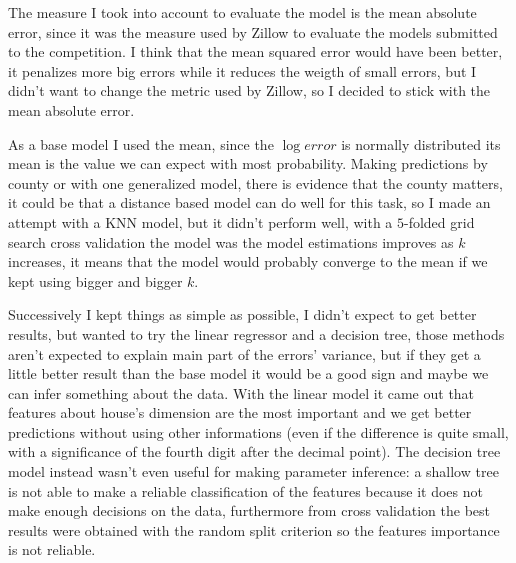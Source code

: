 The measure I took into account to evaluate the model is the mean absolute error, since it was the measure used by Zillow to evaluate the models submitted to the competition. I think that the mean squared error would have been better, it penalizes more big errors while it reduces the weigth of small errors, but I didn't want to change the metric used by Zillow, so I decided to stick with the mean absolute error.


As a base model I used the mean, since the $\log error$ is normally distributed its mean is the value we can expect with most probability. Making predictions by county or with one generalized model, there is evidence that the county matters, it could be that a distance based model can do well for this task, so I made an attempt with a KNN model, but it didn't perform well, with a $5$-folded grid search cross validation the model was the model estimations improves as $k$ increases, it means that the model would probably converge to the mean if we kept using bigger and bigger $k$.


Successively I kept things as simple as possible, I didn't expect to get better results, but wanted to try the linear regressor and a decision tree, those methods aren't expected to explain main part of the errors' variance, but if they get a little better result than the base model it would be a good sign and maybe we can infer something about the data. With the linear model it came out that features about house's dimension are the most important and we get better predictions without using other informations (even if the difference is quite small, with a significance of the fourth digit after the decimal point). The decision tree model instead wasn't even useful for making parameter inference: a shallow tree is not able to make a reliable classification of the features because it does not make enough decisions on the data, furthermore from cross validation the best results were obtained with the random split criterion so the features importance is not reliable.



